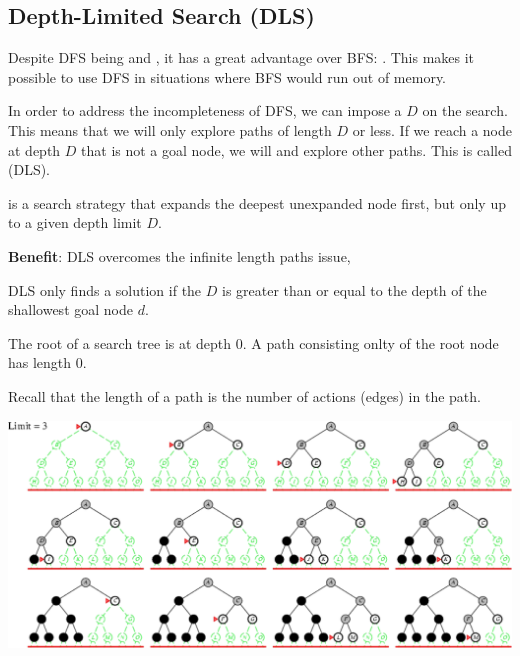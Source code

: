 \subsection{Depth-Limited Search (DLS)}

Despite DFS being  and , it has a great advantage over BFS: . This makes it possible to use DFS in situations where BFS would run out of memory.

In order to address the incompleteness of DFS, we can impose a  $D$ on the search. This means that we will only explore paths of length $D$ or less. If we reach a node at depth $D$ that is not a goal node, we will  and explore other paths. This is called  (DLS).

\begin{definition}\label{def:dls}
     is a search strategy that expands the deepest unexpanded node first, but only up to a given depth limit $D$.
\end{definition}

\begin{listu}
    \item {\color{darkGreen}\textbf{Benefit}:} DLS overcomes the infinite length paths issue,
    \item {} DLS only finds a solution if the  $D$ is greater than or equal to the depth of the shallowest goal node $d$.
\end{listu}

\begin{remark}
    The root of a search tree is at depth 0. A path consisting onlty of the root node has length 0.

    Recall that the length of a path is the number of actions (edges) in the path.
\end{remark}

\begin{center}
    \includegraphics[width=0.67\linewidth]{figures/ids-limit-3.png}
\end{center}

